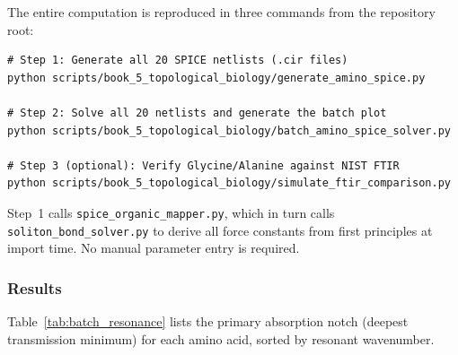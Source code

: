 The entire computation is reproduced in three commands from the repository root:

\begin{verbatim}
# Step 1: Generate all 20 SPICE netlists (.cir files)
python scripts/book_5_topological_biology/generate_amino_spice.py

# Step 2: Solve all 20 netlists and generate the batch plot
python scripts/book_5_topological_biology/batch_amino_spice_solver.py

# Step 3 (optional): Verify Glycine/Alanine against NIST FTIR
python scripts/book_5_topological_biology/simulate_ftir_comparison.py
\end{verbatim}

\noindent Step~1 calls \texttt{spice\_organic\_mapper.py}, which in turn calls \texttt{soliton\_bond\_solver.py} to derive all force constants from first principles at import time. No manual parameter entry is required.

\subsubsection{Results}

Table~\ref{tab:batch_resonance} lists the primary absorption notch (deepest transmission minimum) for each amino acid, sorted by resonant wavenumber.


